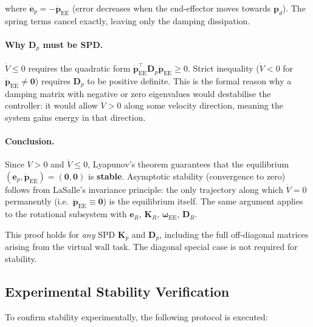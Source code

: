 where $\dot{\mathbf{e}}_p = -\dot{\mathbf{p}}_{\mathrm{EE}}$ (error decreases when
the end-effector moves towards $\mathbf{p}_d$).
The spring terms cancel exactly, leaving only the damping dissipation.

\paragraph{Why $\mathbf{D}_p$ must be SPD.}
$\dot{V} \leq 0$ requires the quadratic form
$\dot{\mathbf{p}}_{\mathrm{EE}}^\top\mathbf{D}_p\dot{\mathbf{p}}_{\mathrm{EE}} \geq 0$.
Strict inequality ($\dot{V} < 0$ for $\dot{\mathbf{p}}_{\mathrm{EE}} \neq \mathbf{0}$)
requires $\mathbf{D}_p$ to be positive definite.
This is the formal reason why a damping matrix with negative or zero
eigenvalues would destabilise the controller: it would allow $\dot{V}>0$
along some velocity direction, meaning the system gains energy in that
direction.

\paragraph{Conclusion.}
Since $V > 0$ and $\dot{V} \leq 0$, Lyapunov's theorem guarantees that
the equilibrium $(\mathbf{e}_p, \dot{\mathbf{p}}_{\mathrm{EE}}) = (\mathbf{0},\mathbf{0})$ is
\textbf{stable}.
Asymptotic stability (convergence to zero) follows from LaSalle's
invariance principle: the only trajectory along which $\dot{V} = 0$
permanently (i.e.\ $\dot{\mathbf{p}}_{\mathrm{EE}} \equiv \mathbf{0}$) is the
equilibrium itself.
The same argument applies to the rotational subsystem with $\mathbf{e}_R$,
$\mathbf{K}_R$, $\boldsymbol{\omega}_{\mathrm{EE}}$, $\mathbf{D}_R$.

\begin{remark}
This proof holds for \emph{any} SPD $\mathbf{K}_p$ and $\mathbf{D}_p$,
including the full off-diagonal matrices arising from the virtual wall
task.
The diagonal special case is not required for stability.
\end{remark}

\subsection{Experimental Stability Verification}

To confirm stability experimentally, the following protocol is executed:

